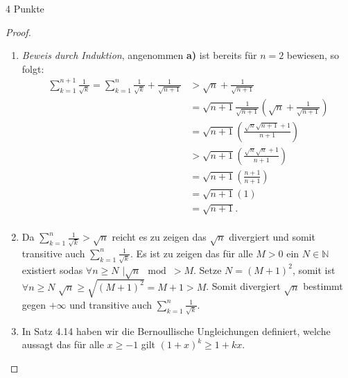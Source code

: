 \documentclass{../problemset}
\begin{document}
\begin{problem}{4 Punkte}
\begin{proof}
	\begin{enumerate}
		\item \textit{Beweis durch Induktion}, angenommen \textbf{a)} ist bereits für $n=2$ bewiesen, so folgt: \begin{align*}
			      \sum_{k=1}^{n+1} \frac{1}{\sqrt{k}} = \sum_{k=1}^{n} \frac{1}{\sqrt{k}} + \frac{1}{\sqrt{n + 1}} & > \sqrt{n} + \frac{1}{\sqrt{n + 1}}                                              \\
			                                                                                                       & = \sqrt{n+1} \frac{1}{\sqrt{n+1}} \left(\sqrt{n} + \frac{1}{\sqrt{n + 1}}\right) \\
			                                                                                                       & = \sqrt{n+1} \left(\frac{\sqrt{n}\sqrt{n+1} + 1}{n + 1}\right)                   \\
			                                                                                                       & > \sqrt{n+1} \left(\frac{\sqrt{n}\sqrt{n} + 1}{n + 1}\right)                     \\
			                                                                                                       & = \sqrt{n+1} \left(\frac{n + 1}{n + 1}\right)                                    \\
			                                                                                                       & = \sqrt{n+1} (1)                                                                 \\
			                                                                                                       & = \sqrt{n+1} \tag*{\checkmark}.                                                  \\
		      \end{align*}
		\item Da $\sum_{k=1}^{n} \frac{1}{\sqrt{k}} > \sqrt{n}$ reicht es zu zeigen das $\sqrt{n}$ divergiert und somit transitive auch $\sum_{k=1}^{n} \frac{1}{\sqrt{k}}$.
		      Es ist zu zeigen das für alle $M > 0$ ein $N \in \mathbb{N}$ existiert sodas $\forall n \ge N$ $\mid \sqrt{n} \mod > M$.
		      Setze $N = {(M + 1)}^2$, somit ist $\forall n \ge N$ $\sqrt{n} \ge \sqrt{{(M + 1)}^2} = M+1 > M$.
		      Somit divergiert $\sqrt{n}$ bestimmt gegen $+\infty$ und transitive auch $\sum_{k=1}^{n} \frac{1}{\sqrt{k}}$.
		      \checkmark
		\item In Satz 4.14 haben wir die Bernoullische Ungleichungen definiert, welche aussagt das für alle $x \ge -1$ gilt ${(1+x)}^k \ge 1 + kx$.

\end{enumerate}
\end{proof}
\end{problem}
\end{document}
